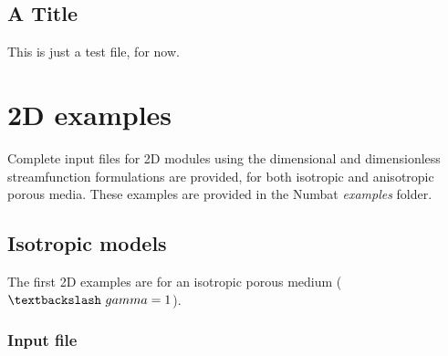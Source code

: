 \documentclass[12pt]{article}
\begin{document}
\subsection{A Title\label{a-title}}
\par
This is just a test file, for now.\section{2D examples\label{2d-examples}}
\par
Complete input files for 2D modules using the dimensional and dimensionless streamfunction formulations are provided, for both isotropic and anisotropic porous media. These examples
are provided in the Numbat \emph{examples} folder.\subsection{Isotropic models\label{isotropic-models}}
\par
The first 2D examples are for an isotropic porous medium ($\textbackslash~gamma = 1$).\subsubsection{Input file\label{input-file}}
\par
\end{document}
